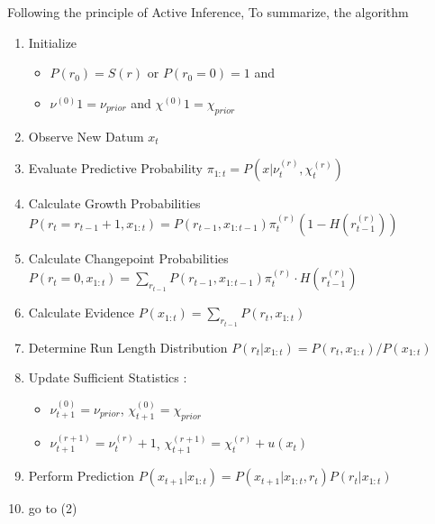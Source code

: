 \documentclass[profile,final,english, draft]{article}%
\begin{document}
%

Following the principle of Active Inference,
To summarize, the algorithm %

\begin{enumerate}
	\item     Initialize

	\begin{itemize}
		\item    $P(r_0)= S(r)$ or $P(r_0=0)=1$ and
		\item    $\nu^{(0)}1 = \nu_{prior}$ and $\chi^{(0)}1 = \chi_{prior}$
	\end{itemize}

	\item    Observe New Datum $x_t$
    \item    Evaluate Predictive Probability $\pi_{1:t} = P(x |\nu^{(r)}_t,\chi^{(r)}_t)$
    \item    Calculate Growth Probabilities $P(r_t=r_{t-1}+1, x_{1:t}) = P(r_{t-1}, x_{1:t-1}) \pi^{(r)}_t (1-H(r^{(r)}_{t-1}))$
    \item    Calculate Changepoint Probabilities $P(r_t=0, x_{1:t})= \sum_{r_{t-1}} P(r_{t-1}, x_{1:t-1}) \pi^{(r)}_t \cdot H(r^{(r)}_{t-1})$
    \item    Calculate Evidence $P(x_{1:t}) = \sum_{r_{t-1}} P (r_t, x_{1:t})$
    \item    Determine Run Length Distribution $P (r_t | x_{1:t}) = P (r_t, x_{1:t})/P (x_{1:t}) $
    \item    Update Sufficient Statistics :
	\begin{itemize}
		\item    $\nu^{(0)}_{t+1} = \nu_{prior}$, $\chi^{(0)}_{t+1} = \chi_{prior}$
		\item    $\nu^{(r+1)}_{t+1} = \nu^{(r)}_{t} +1$, $\chi^{(r+1)}_{t+1} = \chi^{(r)}_{t} + u(x_t)$
	\end{itemize}

    \item    Perform Prediction $P (x_{t+1} | x_{1:t}) = P (x_{t+1}|x_{1:t} , r_t) P (r_t|x_{1:t})$
    \item    go to (2)
\end{enumerate}
\end{document}
